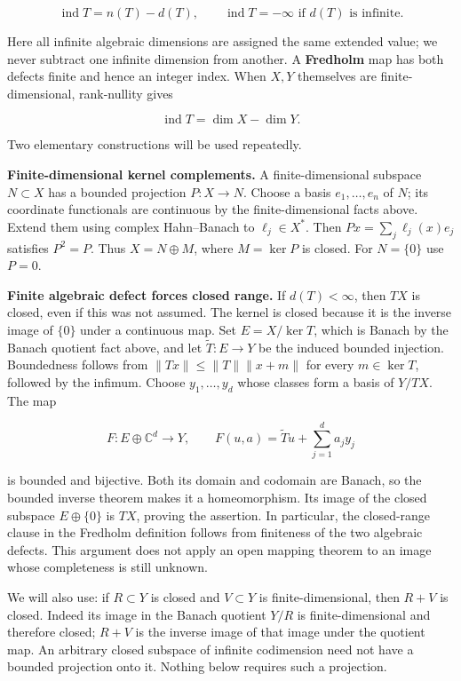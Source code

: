 \documentclass[
  11pt,
]{article}
\begin{document}
\[
\operatorname{ind}T=n(T)-d(T),\qquad
\operatorname{ind}T=-\infty\text{ if }d(T)\text{ is infinite}.       \tag{F1}
\]

Here all infinite algebraic dimensions are assigned the same extended
value; we never subtract one infinite dimension from another. A
\textbf{Fredholm} map has both defects finite and hence an integer
index. When \(X,Y\) themselves are finite-dimensional, rank-nullity
gives

\[
\operatorname{ind}T=\dim X-\dim Y.                              \tag{F2}
\]

Two elementary constructions will be used repeatedly.

\textbf{Finite-dimensional kernel complements.} A finite-dimensional
subspace \(N\subset X\) has a bounded projection \(P:X\to N\). Choose a
basis \(e_1,\ldots,e_n\) of \(N\); its coordinate functionals are
continuous by the finite-dimensional facts above. Extend them using
complex Hahn--Banach to \(\ell_j\in X^*\). Then
\(Px=\sum_j\ell_j(x)e_j\) satisfies \(P^2=P\). Thus \(X=N\oplus M\),
where \(M=\ker P\) is closed. For \(N=\{0\}\) use \(P=0\).

\textbf{Finite algebraic defect forces closed range.} If
\(d(T)<\infty\), then \(TX\) is closed, even if this was not assumed.
The kernel is closed because it is the inverse image of \(\{0\}\) under
a continuous map. Set \(E=X/\ker T\), which is Banach by the Banach
quotient fact above, and let \(\widetilde T:E\to Y\) be the induced
bounded injection. Boundedness follows from \(\|Tx\|\leq\|T\|\|x+m\|\)
for every \(m\in\ker T\), followed by the infimum. Choose
\(y_1,\ldots,y_d\) whose classes form a basis of \(Y/TX\). The map

\[
F:E\oplus\mathbb C^d\longrightarrow Y,\qquad
F(u,a)=\widetilde Tu+\sum_{j=1}^d a_jy_j                         \tag{F3}
\]

is bounded and bijective. Both its domain and codomain are Banach, so
the bounded inverse theorem makes it a homeomorphism. Its image of the
closed subspace \(E\oplus\{0\}\) is \(TX\), proving the assertion. In
particular, the closed-range clause in the Fredholm definition follows
from finiteness of the two algebraic defects. This argument does not
apply an open mapping theorem to an image whose completeness is still
unknown.

We will also use: if \(R\subset Y\) is closed and \(V\subset Y\) is
finite-dimensional, then \(R+V\) is closed. Indeed its image in the
Banach quotient \(Y/R\) is finite-dimensional and therefore closed;
\(R+V\) is the inverse image of that image under the quotient map. An
arbitrary closed subspace of infinite codimension need not have a
bounded projection onto it. Nothing below requires such a projection.
\end{document}
